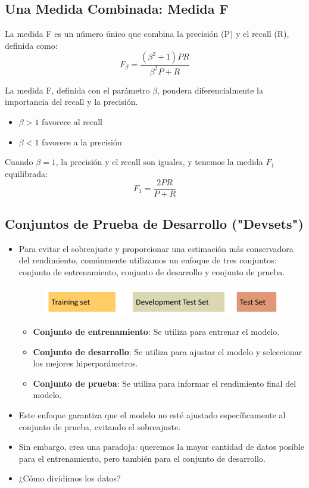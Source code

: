 \documentclass[11pt,fleqn]{book} %
\begin{document}
\subsection{Una Medida Combinada: Medida F}
La medida F es un número único que combina la precisión (P) y el recall (R), definida como:
\[
F_\beta = \frac{(\beta^2+1)PR}{\beta^2P + R}
\]

La medida F, definida con el parámetro $\beta$, pondera diferencialmente la importancia del recall y la precisión.
\begin{itemize}
  \item $\beta > 1$ favorece al recall
  \item $\beta < 1$ favorece a la precisión
\end{itemize}

Cuando $\beta = 1$, la precisión y el recall son iguales, y tenemos la medida $F_1$ equilibrada:
\[
F_1 = \frac{2PR}{P + R}
\]

\subsection{Conjuntos de Prueba de Desarrollo ("Devsets")}

\begin{itemize}
 \item Para evitar el sobreajuste y proporcionar una estimación más conservadora del rendimiento, comúnmente utilizamos un enfoque de tres conjuntos: conjunto de entrenamiento, conjunto de desarrollo y conjunto de prueba.
\begin{figure}[h]
\includegraphics[scale = 0.23]{pics/devsets.png}
\end{figure}

\begin{itemize}
\item \textbf{Conjunto de entrenamiento}: Se utiliza para entrenar el modelo.
\item \textbf{Conjunto de desarrollo}: Se utiliza para ajustar el modelo y seleccionar los mejores hiperparámetros.
\item \textbf{Conjunto de prueba}: Se utiliza para informar el rendimiento final del modelo.
\end{itemize}

\item Este enfoque garantiza que el modelo no esté ajustado específicamente al conjunto de prueba, evitando el sobreajuste.
\item Sin embargo, crea una paradoja: queremos la mayor cantidad de datos posible para el entrenamiento, pero también para el conjunto de desarrollo.
\item ¿Cómo dividimos los datos?

\end{itemize}
\end{document}
